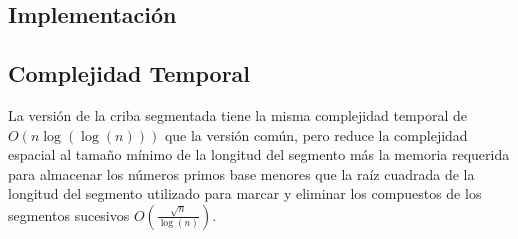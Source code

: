 \documentclass[12pt]{article}
\newcommand{\nl}{\vspace{0.3cm}}
\begin{document}
\subsection{Implementación}



\subsection{Complejidad Temporal}

\nl

La versión de la criba segmentada tiene la misma complejidad temporal de $O(n \log(\log(n)))$ que la versión común, pero reduce la complejidad espacial al tamaño mínimo de la longitud del segmento más la memoria requerida para almacenar los números primos base menores que la raíz cuadrada de la longitud del segmento utilizado para marcar y eliminar los compuestos de los segmentos sucesivos $O\left(\frac{\sqrt{n}}{\log(n)}\right)$.

\nocite{*}


\end{document}
